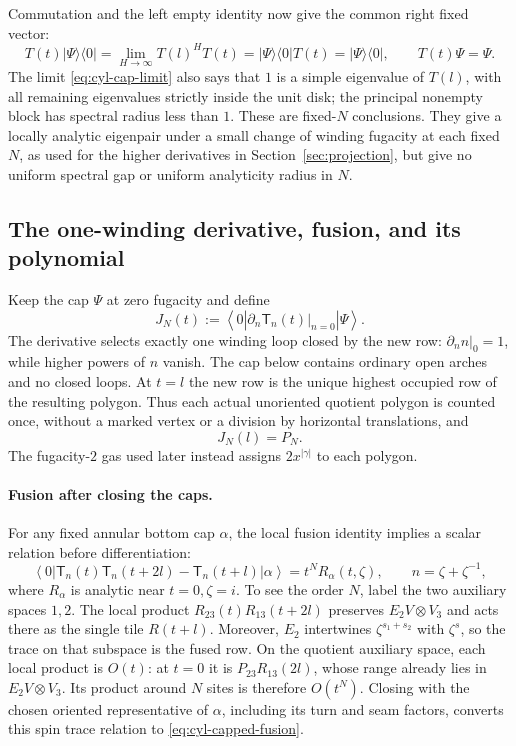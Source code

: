 Commutation and the left empty identity now give the common right
fixed vector:
\[
 T(t)|\Psi\rangle\langle0|
   =\lim_{H\to\infty}T(l)^H T(t)
   =|\Psi\rangle\langle0|T(t)
   =|\Psi\rangle\langle0|,
 \qquad T(t)\Psi=\Psi.
\]
The limit \eqref{eq:cyl-cap-limit} also says that \(1\) is a simple
eigenvalue of \(T(l)\), with all remaining eigenvalues strictly inside
the unit disk; the principal nonempty block has spectral radius less
than \(1\).  These are fixed-\(N\) conclusions.  They give a locally
analytic eigenpair under a small change of winding fugacity at each
fixed \(N\), as used for the higher derivatives in
Section~\ref{sec:projection}, but give no uniform spectral gap or
uniform analyticity radius in \(N\).

\subsection{The one-winding derivative, fusion, and its polynomial}

Keep the cap \(\Psi\) at zero fugacity and define
\begin{equation}\label{eq:cyl-bare-J}
 J_N(t):=
 \left\langle0\left|
       \left.\partial_n\mathsf T_n(t)\right|_{n=0}
 \right|\Psi\right\rangle .
\end{equation}
The derivative selects exactly one winding loop closed by the new
row: \(\partial_n n|_{0}=1\), while higher powers of \(n\) vanish.
The cap below contains ordinary open arches and no closed loops.
At \(t=l\) the new row is the unique highest occupied row of the
resulting polygon.  Thus each actual unoriented quotient polygon is
counted once, without a marked vertex or a division by horizontal
translations, and
\[
 J_N(l)=P_N.
\]
The fugacity-\(2\) gas used later instead assigns \(2x^{|\gamma|}\)
to each polygon.

\paragraph{Fusion after closing the caps.}
For any fixed annular bottom cap \(\alpha\), the local fusion identity
implies a scalar relation before differentiation:
\begin{equation}\label{eq:cyl-capped-fusion}
 \left\langle0\left|
   \mathsf T_n(t)\mathsf T_n(t+2l)-\mathsf T_n(t+l)
 \right|\alpha\right\rangle
 =t^N R_\alpha(t,\zeta),
 \qquad n=\zeta+\zeta^{-1},
\end{equation}
where \(R_\alpha\) is analytic near \(t=0,\zeta=i\).
To see the order \(N\), label the two auxiliary spaces \(1,2\).
The local product
\(R_{23}(t)R_{13}(t+2l)\) preserves
\(E_2V\otimes V_3\) and acts there as the single tile \(R(t+l)\).
Moreover, \(E_2\) intertwines \(\zeta^{s_1+s_2}\) with
\(\zeta^s\), so the trace on that subspace is the fused row.  On the
quotient auxiliary space, each local product is \(O(t)\): at \(t=0\)
it is \(P_{23}R_{13}(2l)\), whose range already lies in
\(E_2V\otimes V_3\).  Its product around \(N\) sites is therefore
\(O(t^N)\).  Closing with the chosen oriented representative of
\(\alpha\), including its turn and seam factors, converts this spin
trace relation to \eqref{eq:cyl-capped-fusion}.

